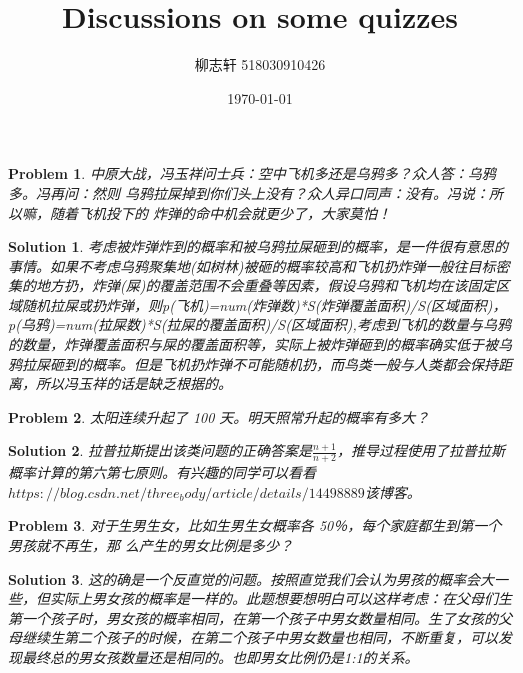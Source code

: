 \documentclass{article}
\title{Discussions on some quizzes}
\author{柳志轩 518030910426}
\date{\today}
\newtheorem{problem}{Problem}
\newtheorem{solution}{Solution}
\begin{document}
    \maketitle
\begin{problem}
	中原大战，冯玉祥问士兵：空中飞机多还是乌鸦多？众人答：乌鸦多。冯再问：然则
	乌鸦拉屎掉到你们头上没有？众人异口同声：没有。冯说：所以嘛，随着飞机投下的
	炸弹的命中机会就更少了，大家莫怕！
\end{problem}

\begin{solution}
	考虑被炸弹炸到的概率和被乌鸦拉屎砸到的概率，是一件很有意思的事情。如果不考虑乌鸦聚集地(如树林)被砸的概率较高和飞机扔炸弹一般往目标密集的地方扔，炸弹(屎)的覆盖范围不会重叠等因素，假设乌鸦和飞机均在该固定区域随机拉屎或扔炸弹，则p(飞机)=num(炸弹数)*S(炸弹覆盖面积)/S(区域面积)，p(乌鸦)=num(拉屎数)*S(拉屎的覆盖面积)/S(区域面积),考虑到飞机的数量与乌鸦的数量，炸弹覆盖面积与屎的覆盖面积等，实际上被炸弹砸到的概率确实低于被乌鸦拉屎砸到的概率。但是飞机扔炸弹不可能随机扔，而鸟类一般与人类都会保持距离，所以冯玉祥的话是缺乏根据的。
\end{solution}

\begin{problem}
	太阳连续升起了 100 天。明天照常升起的概率有多大？
\end{problem}

\begin{solution}
	拉普拉斯提出该类问题的正确答案是$\frac{n+1}{n+2}$，推导过程使用了拉普拉斯概率计算的第六第七原则。有兴趣的同学可以看看$https://blog.csdn.net/three_body/article/details/14498889$该博客。
\end{solution}

\begin{problem}
	对于生男生女，比如生男生女概率各 50％，每个家庭都生到第一个男孩就不再生，那
	么产生的男女比例是多少？
\end{problem}

\begin{solution}
	这的确是一个反直觉的问题。按照直觉我们会认为男孩的概率会大一些，但实际上男女孩的概率是一样的。此题想要想明白可以这样考虑：在父母们生第一个孩子时，男女孩的概率相同，在第一个孩子中男女数量相同。生了女孩的父母继续生第二个孩子的时候，在第二个孩子中男女数量也相同，不断重复，可以发现最终总的男女孩数量还是相同的。也即男女比例仍是1:1的关系。
\end{solution}
\end{document}
